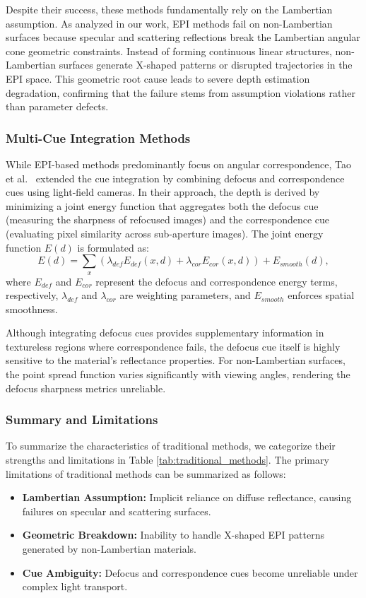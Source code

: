 \documentclass[lettersize,journal]{IEEEtran}
\begin{document}
Despite their success, these methods fundamentally rely on the Lambertian assumption. As analyzed in our work, EPI methods fail on non-Lambertian surfaces because specular and scattering reflections break the Lambertian angular cone geometric constraints. Instead of forming continuous linear structures, non-Lambertian surfaces generate X-shaped patterns or disrupted trajectories in the EPI space. This geometric root cause leads to severe depth estimation degradation, confirming that the failure stems from assumption violations rather than parameter defects.

\subsubsection{Multi-Cue Integration Methods}
While EPI-based methods predominantly focus on angular correspondence, Tao et al.\ \cite{tao2013depth} extended the cue integration by combining defocus and correspondence cues using light-field cameras. In their approach, the depth is derived by minimizing a joint energy function that aggregates both the defocus cue (measuring the sharpness of refocused images) and the correspondence cue (evaluating pixel similarity across sub-aperture images). The joint energy function $E(d)$ is formulated as:
\begin{equation}
E(d) = \sum_{x} \left( \lambda_{def} E_{def}(x, d) + \lambda_{cor} E_{cor}(x, d) \right) + E_{smooth}(d),
\label{eq:ch2_2}
\end{equation}
where $E_{def}$ and $E_{cor}$ represent the defocus and correspondence energy terms, respectively, $\lambda_{def}$ and $\lambda_{cor}$ are weighting parameters, and $E_{smooth}$ enforces spatial smoothness. 

Although integrating defocus cues provides supplementary information in textureless regions where correspondence fails, the defocus cue itself is highly sensitive to the material's reflectance properties. For non-Lambertian surfaces, the point spread function varies significantly with viewing angles, rendering the defocus sharpness metrics unreliable.

\subsubsection{Summary and Limitations}
To summarize the characteristics of traditional methods, we categorize their strengths and limitations in Table \ref{tab:traditional_methods}. The primary limitations of traditional methods can be summarized as follows:
\begin{itemize}
\item \textbf{Lambertian Assumption:} Implicit reliance on diffuse reflectance, causing failures on specular and scattering surfaces.
\item \textbf{Geometric Breakdown:} Inability to handle X-shaped EPI patterns generated by non-Lambertian materials.
\item \textbf{Cue Ambiguity:} Defocus and correspondence cues become unreliable under complex light transport.
\end{itemize}
\end{document}
